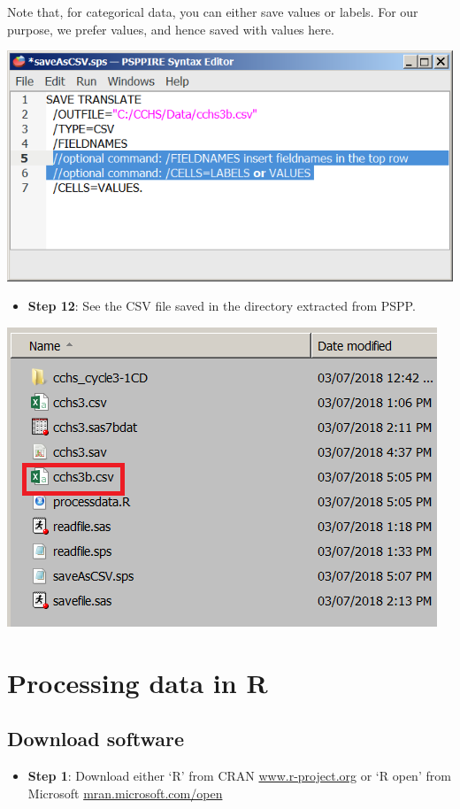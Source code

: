 \documentclass[
]{book}
\providecommand{\tightlist}{%
  \setlength{\itemsep}{0pt}\setlength{\parskip}{0pt}}
\begin{document}
Note that, for categorical data, you can either save values or labels. For our purpose, we prefer values, and hence saved with values here.

\includegraphics[width=0.65\linewidth]{images/abacus41}

\begin{itemize}
\tightlist
\item
  \textbf{Step 12}: See the CSV file saved in the directory extracted from PSPP.
\end{itemize}

\includegraphics[width=0.65\linewidth]{images/abacus42}

\hypertarget{processing-data-in-r}{%
\section{Processing data in R}\label{processing-data-in-r}}

\hypertarget{download-software}{%
\subsection{Download software}\label{download-software}}

\begin{itemize}
\tightlist
\item
  \textbf{Step 1}: Download either `R' from CRAN \href{https://www.r-project.org/}{www.r-project.org} or `R open' from Microsoft \href{https://mran.microsoft.com/open}{mran.microsoft.com/open}
\end{itemize}
\end{document}
